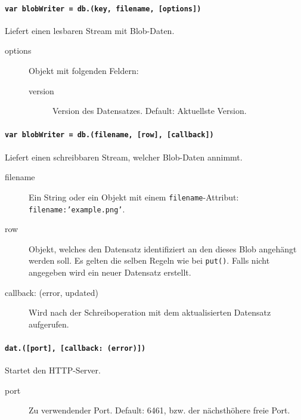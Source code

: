 
\paragraph{\texttt{var blobWriter = db.(key, filename, [options])}}
Liefert einen lesbaren Stream mit Blob-Daten.

\begin{description}
\item[options] Objekt mit folgenden Feldern:
    \begin{description}
    \item[version] Version des Datensatzes. Default: Aktuellste Version.
    \end{description}
\end{description}


\paragraph{\texttt{var blobWriter = db.(filename, [row], [callback])}}
Liefert einen schreibbaren Stream, welcher Blob-Daten annimmt.

\begin{description}
\item[filename] Ein String oder ein Objekt mit einem \texttt{filename}-Attribut: \texttt{{filename:'example.png'}}.
\item[row] Objekt, welches den Datensatz identifiziert an den dieses Blob angehängt werden soll. Es gelten die selben Regeln wie bei \texttt{put()}. Falls nicht angegeben wird ein neuer Datensatz erstellt.
\item[callback: (error, updated)] Wird nach der Schreiboperation mit dem aktualisierten Datensatz aufgerufen.
\end{description}


\paragraph{\texttt{dat.([port], [callback: (error)])}}
Startet den HTTP-Server.

\begin{description}
\item[port] Zu verwendender Port. Default: 6461, bzw. der nächsthöhere freie Port.
\end{description}

